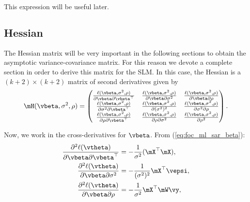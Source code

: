\documentclass[english,12pt]{book}\usepackage[]{graphicx}\usepackage[]{xcolor}
\begin{document}
This expression will be useful later. 

\subsection{Hessian}\label{sec:Hessian}

The Hessian matrix will be very important in the following sections to obtain the asymptotic variance-covariance matrix. For this reason we devote a complete section in order to derive this matrix for the SLM. In this case, the Hessian is a $(k + 2)\times (k + 2)$ matrix of second derivatives given by
\begin{equation*}
	\mH(\vbeta, \sigma^2, \rho) = 
	\begin{pmatrix}
		\frac{\ell(\vbeta, \sigma^2,\rho)}{\partial \vbeta \partial \vbeta^\top} & \frac{\ell(\vbeta, \sigma^2,\rho)}{\partial \vbeta \partial \sigma^2} & \frac{\ell(\vbeta, \sigma^2,\rho)}{\partial \vbeta \partial \rho} \\
		\frac{\ell(\vbeta, \sigma^2,\rho)}{\partial \sigma^2 \partial \vbeta^\top} & \frac{\ell(\vbeta, \sigma^2,\rho)}{\partial (\sigma^2)^2} & \frac{\ell(\vbeta, \sigma^2,\rho)}{\partial \sigma^2 \partial \rho} \\
		\frac{\ell(\vbeta, \sigma^2,\rho)}{\partial \rho \partial \vbeta^\top} & \frac{\ell(\vbeta, \sigma^2,\rho)}{\partial \rho \partial \sigma^2} & \frac{\ell(\vbeta, \sigma^2,\rho)}{\partial \rho^2}
	\end{pmatrix}. 
\end{equation*}

Now, we work in the cross-derivatives for $\vbeta$. From (\ref{eq:foc_ml_sar_beta}):
\begin{align}
  \frac{\partial^2 \ell(\vtheta)}{\partial \vbeta \partial \vbeta^\top}  & =  - \frac{1}{\sigma^2}(\mX^\top \mX), \label{eq:sar_der_beta_beta} \\
  \frac{\partial^2  \ell(\vtheta)}{\partial \vbeta \partial \sigma^2} &= - \frac{1}{(\sigma^2)^2} \mX^\top \vepsi,\label{eq:sar_der_beta_sigma} \\
  \frac{\partial^2  \ell(\vtheta)}{\partial \vbeta \partial \rho}  & =  - \frac{1}{\sigma^2} \mX^\top \mW\vy\label{eq:sar_der_beta_rho},
\end{align}
\end{document}
